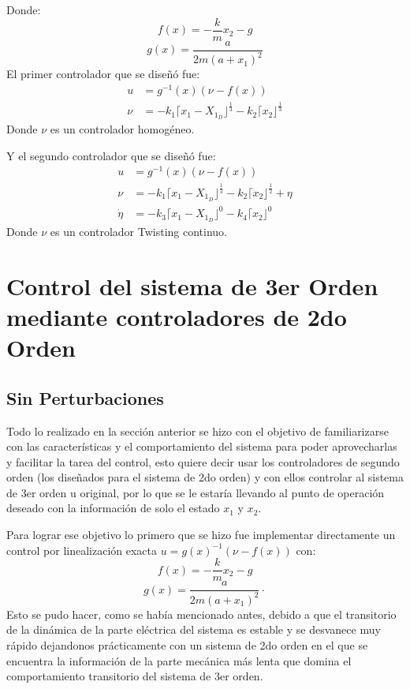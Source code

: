 \documentclass[onecolumn,10pt]{article}
\begin{document}
Donde:
$$
f(x)= - \dfrac{k}{m} x_2 - g
$$
$$
g(x)=\dfrac{a}{2m(a+x_1)^{2}}
$$
El primer controlador que se dise\~n\'o fue:
\begin{equation*}
\begin{split}
 u&=g^{-1}(x)(\nu-f(x))\\
 \nu&=-k_1\lceil x_1-X_{1_{D}} \rfloor ^{\frac{1}{3}}-k_2\lceil x_2 \rfloor ^{\frac{1}{3}}
\end{split}
\end{equation*}
Donde $\nu$ es un controlador homog\'eneo.

Y el segundo controlador que se dise\~n\'o fue:
\begin{equation*}
\begin{split}
 u&=g^{-1}(x)(\nu-f(x))\\
 \nu&=-k_1\lceil x_1-X_{1_{D}} \rfloor ^{\frac{1}{3}}-k_2\lceil x_2 \rfloor ^{\frac{1}{2}}+\eta \\
\dot{\eta}&=-k_3\lceil x_1-X_{1_{D}} \rfloor ^{0}-k_4\lceil x_2 \rfloor ^{0} 
\end{split}
\end{equation*}
Donde $\nu$ es un controlador Twisting continuo.

\section{Control del sistema de 3er Orden mediante controladores de 2do Orden}
\subsection*{Sin Perturbaciones}
Todo lo realizado en la secci\'on anterior se hizo con el objetivo de familiarizarse con las caracter\'isticas y el comportamiento del sistema para poder aprovecharlas y facilitar la tarea del control, esto quiere decir usar los controladores de segundo orden (los dise\~nados para el sistema de 2do orden) y con ellos controlar al sistema de 3er orden u original, por lo que se le estar\'ia llevando al punto de operaci\'on deseado con la informaci\'on de solo el estado $x_1$ y $x_2$.

Para lograr ese objetivo lo primero que se hizo fue implementar directamente un control por linealizaci\'on exacta $u=g(x)^{-1}(\nu-f(x))$ con:
$$
f(x)= - \dfrac{k}{m} x_2 - g
$$
$$
g(x)=\dfrac{a}{2m(a+x_1)^{2}}\cdot
$$
Esto se pudo hacer, como se hab\'ia mencionado antes, debido a que el transitorio de la din\'amica de la parte el\'ectrica del sistema es estable y se desvanece muy r\'apido dejandonos pr\'acticamente con un sistema de 2do orden en el que se encuentra la informaci\'on de la parte mec\'anica m\'as lenta que domina el comportamiento transitorio del sistema de 3er orden.
\end{document}
